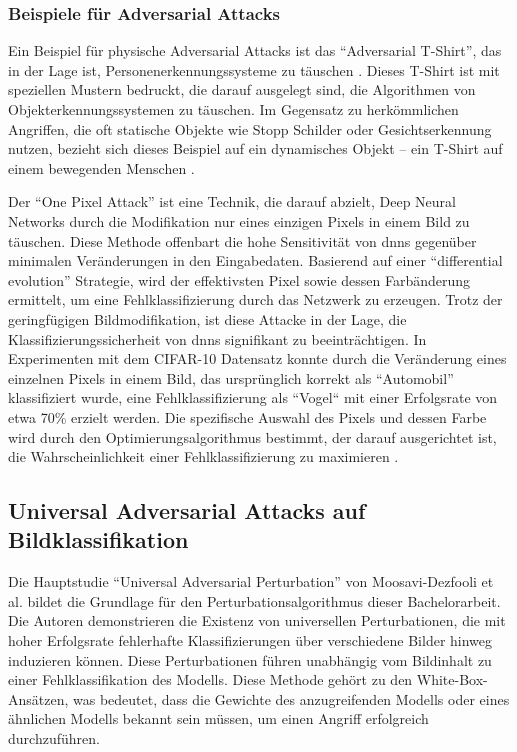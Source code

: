 
\subsubsection{Beispiele für Adversarial Attacks} 

Ein Beispiel für physische Adversarial Attacks ist das  ``Adversarial T-Shirt'', das in der Lage ist, Personenerkennungssysteme zu täuschen \cite{xu_adversarial_2020}. Dieses T-Shirt ist mit speziellen Mustern bedruckt, die darauf ausgelegt sind, die Algorithmen von Objekterkennungssystemen zu täuschen. Im Gegensatz zu herkömmlichen Angriffen, die oft statische Objekte wie Stopp Schilder oder Gesichtserkennung nutzen, bezieht sich dieses Beispiel auf ein dynamisches Objekt – ein T-Shirt auf einem bewegenden Menschen \cite{xu_adversarial_2020}. 

Der ``One Pixel Attack'' \cite{su_one_2019} ist eine Technik, die darauf abzielt, Deep Neural Networks durch die Modifikation nur eines einzigen Pixels in einem Bild zu täuschen. Diese Methode offenbart die hohe Sensitivität von \acrlong{dnn}s gegenüber minimalen Veränderungen in den Eingabedaten. Basierend auf einer ``differential evolution'' Strategie, wird der effektivsten Pixel sowie dessen Farbänderung ermittelt, um eine Fehlklassifizierung durch das Netzwerk zu erzeugen. Trotz der geringfügigen Bildmodifikation, ist diese Attacke in der Lage, die Klassifizierungssicherheit von \acrlong{dnn}s signifikant zu beeinträchtigen.
In Experimenten mit dem CIFAR-10 Datensatz konnte durch die Veränderung eines einzelnen Pixels in einem Bild, das ursprünglich korrekt als ``Automobil'' klassifiziert wurde, eine Fehlklassifizierung als ``Vogel`` mit einer Erfolgsrate von etwa 70\% erzielt werden. Die spezifische Auswahl des Pixels und dessen Farbe wird durch den Optimierungsalgorithmus bestimmt, der darauf ausgerichtet ist, die Wahrscheinlichkeit einer Fehlklassifizierung zu maximieren .

\subsection{Universal Adversarial Attacks auf Bildklassifikation}

Die Hauptstudie ``Universal Adversarial Perturbation'' von Moosavi-Dezfooli et al. \cite{moosavi-dezfooli_universal_2017} bildet die Grundlage für den Perturbationsalgorithmus dieser Bachelorarbeit. Die Autoren demonstrieren die Existenz von universellen Perturbationen, die mit hoher Erfolgsrate fehlerhafte Klassifizierungen über verschiedene Bilder hinweg induzieren können. Diese Perturbationen führen unabhängig vom Bildinhalt zu einer Fehlklassifikation des Modells. Diese Methode gehört zu den White-Box-Ansätzen, was bedeutet, dass die Gewichte des anzugreifenden Modells oder eines ähnlichen Modells bekannt sein müssen, um einen Angriff erfolgreich durchzuführen.

